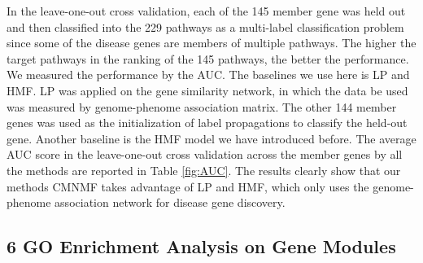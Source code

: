 \documentclass{bmcart}
\begin{document}
 In the leave-one-out cross validation, each of the 145 member gene was held out and then classified into the 229 pathways as a multi-label classification problem since some of the disease genes are
members of multiple pathways. The higher the target pathways in the ranking of the 145 pathways, the better the performance. We measured the performance by the AUC. The baselines we use here is LP and HMF. LP was applied on the gene similarity network, in which the data be used was measured by genome-phenome association matrix. The other 144 member genes was used as the initialization of label propagations to classify the held-out gene. Another baseline is the HMF model we have introduced before. The average AUC score in the leave-one-out cross validation across the  member genes by all the methods are reported in Table \ref{fig:AUC}. The results clearly show that our methods CMNMF takes advantage of LP and HMF, which only uses the genome-phenome association network for disease gene discovery.

\subsection*{\textbf{6 GO Enrichment Analysis on Gene Modules}}
\end{document}
